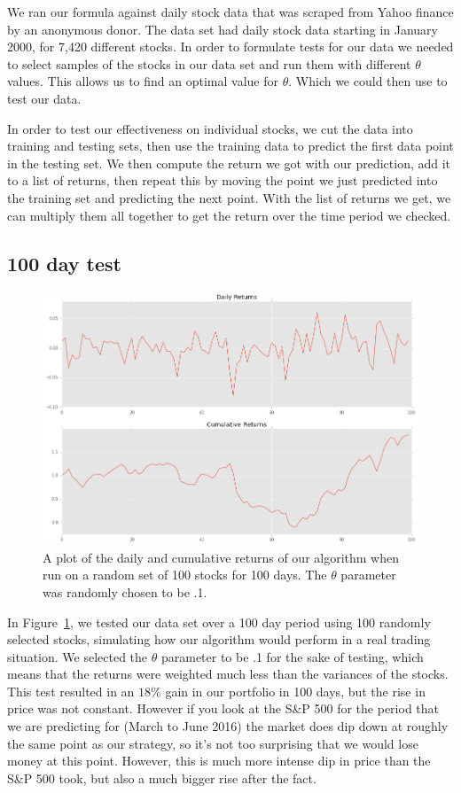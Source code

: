 \documentclass{article}
\begin{document}
We ran our formula against daily stock data that was scraped from Yahoo finance by an anonymous donor.  The data set had daily stock data starting in January 2000, for 7,420 different stocks.  In order to formulate tests for our data we needed to select samples of the stocks in our data set and run them with different $\theta$ values.  This allows us to find an optimal value for $\theta$. Which we could then use to test our data.  

In order to test our effectiveness on individual stocks, we cut the data into training and testing sets, then use the training data to predict the first data point in the testing set. We then compute the return we got with our prediction, add it to a list of returns, then repeat this by moving the point we just predicted into the training set and predicting the next point.  With the list of returns we get, we can multiply them all together to get the return over the time period we checked.

\subsection{100 day test}

\begin{figure}[H]
  \includegraphics[scale=.5]{pointonereturns.png}
  \caption{A plot of the daily and cumulative returns of our algorithm when run on a random set of 100 stocks for 100 days.  The $\theta$ parameter was randomly chosen to be .1.}
  \label{fig:returns}
\end{figure}
In Figure~\ref{fig:returns}, we tested our data set over a 100 day period using 100 randomly selected stocks, simulating how our algorithm would perform in a real trading situation.  We selected the $\theta$ parameter to be .1 for the sake of testing, which means that the returns were weighted much less than the variances of the stocks.  This test resulted in an $18\%$ gain in our portfolio in 100 days, but the rise in price was not constant.  However if you look at the S\&P 500 for the period that we are predicting for (March to June 2016) the market does dip down at roughly the same point as our strategy, so it's not too surprising that we would lose money at this point. However, this is much more intense dip in price than the S\&P 500 took, but also a much bigger rise after the fact.
\end{document}
